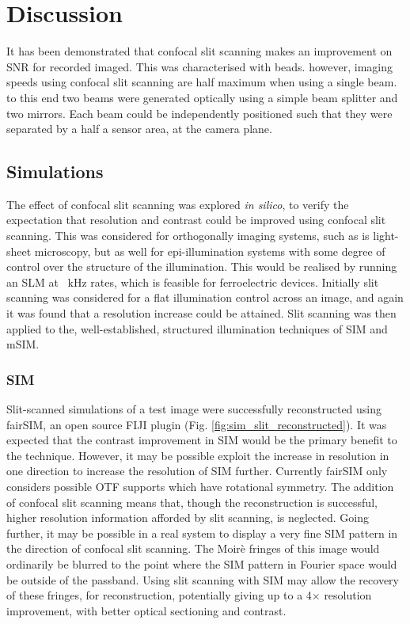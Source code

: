 \section{Discussion}

It has been demonstrated that confocal slit scanning makes an improvement on SNR for recorded imaged.
This was characterised with beads.
however, imaging speeds using confocal slit scanning are half maximum when using a single beam.
to this end two beams were generated optically using a simple beam splitter and two mirrors.
Each beam could be independently positioned such that they were separated by a half a sensor area, at the camera plane.

\subsection{Simulations}

The effect of confocal slit scanning was explored \emph{in silico}, to verify the expectation that resolution and contrast could be improved using confocal slit scanning.
This was considered for orthogonally imaging systems, such as is light-sheet microscopy, but as well for epi-illumination systems with some degree of control over the structure of the illumination.
This would be realised by running an SLM at \SI{}{\kilo\hertz} rates, which is feasible for ferroelectric devices.
Initially slit scanning was considered for a flat illumination control across an image, and again it was found that a resolution increase could be attained.
Slit scanning was then applied to the, well-established, structured illumination techniques of SIM and mSIM.

\subsubsection{SIM}

Slit-scanned simulations of a test image were successfully reconstructed using fairSIM, an open source FIJI plugin (Fig. \ref{fig:sim_slit_reconstructed}).
It was expected that the contrast improvement in SIM would be the primary benefit to the technique.
However, it may be possible exploit the increase in resolution in one direction to increase the resolution of SIM further.
Currently fairSIM only considers possible OTF supports which have rotational symmetry.
The addition of confocal slit scanning means that, though the reconstruction is successful, higher resolution information afforded by slit scanning, is neglected.
Going further, it may be possible in a real system to display a very fine SIM pattern in the direction of confocal slit scanning.
The Moirè fringes of this image would ordinarily be blurred to the point where the SIM pattern in Fourier space would be outside of the passband.
Using slit scanning with SIM may allow the recovery of these fringes, for reconstruction, potentially giving up to a 4$\times$ resolution improvement, with better optical sectioning and contrast.


